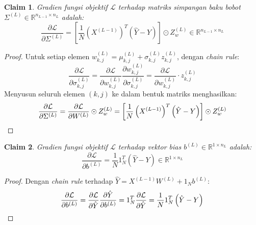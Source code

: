 \documentclass[11pt,a4paper]{article}
\def\mathbf#1{#1}%
\theoremstyle{plain}
\newtheorem{claim}{Claim}[section]
\theoremstyle{definition}
\theoremstyle{remark}
\begin{document}
\begin{claim}
Gradien fungsi objektif $\mathcal{L}$ terhadap matriks simpangan baku bobot $\Sigma^{(L)} \in \mathbb{R}^{n_{L-1} \times n_L}$ adalah:
\begin{equation}
    \frac{\partial \mathcal{L}}{\partial \Sigma^{(L)}} = \left[ \frac{1}{N} \left( X^{(L-1)} \right)^T \left( \hat{Y} - Y \right) \right] \odot Z_w^{(L)} \in \mathbb{R}^{n_{L-1} \times n_L} \label{eq:grad_SigmaL}
\end{equation}
\end{claim}
\begin{proof}
Untuk setiap elemen $w^{(L)}_{k, j} = \mu^{(L)}_{k, j} + \sigma^{(L)}_{k, j} z^{(L)}_{k, j}$, dengan \textit{chain rule}:
\begin{equation}
    \frac{\partial \mathcal{L}}{\partial \sigma^{(L)}_{k, j}} = \frac{\partial \mathcal{L}}{\partial w^{(L)}_{k, j}} \frac{\partial w^{(L)}_{k, j}}{\partial \sigma^{(L)}_{k, j}} = \frac{\partial \mathcal{L}}{\partial w^{(L)}_{k, j}} \cdot z^{(L)}_{k, j}
\end{equation}
Menyusun seluruh elemen $(k, j)$ ke dalam bentuk matriks menghasilkan:
\begin{equation}
    \frac{\partial \mathcal{L}}{\partial \Sigma^{(L)}} = \frac{\partial \mathcal{L}}{\partial W^{(L)}} \odot Z_w^{(L)} = \left[ \frac{1}{N} \left( X^{(L-1)} \right)^T \left( \hat{Y} - Y \right) \right] \odot Z_w^{(L)} \qedhere
\end{equation}
\end{proof}

\begin{claim}
Gradien fungsi objektif $\mathcal{L}$ terhadap vektor bias $\mathbf{b}^{(L)} \in \mathbb{R}^{1 \times n_L}$ adalah:
\begin{equation}
    \frac{\partial \mathcal{L}}{\partial \mathbf{b}^{(L)}} = \frac{1}{N} \mathbf{1}_N^T \left( \hat{Y} - Y \right) \in \mathbb{R}^{1 \times n_L} \label{eq:grad_bL}
\end{equation}
\end{claim}
\begin{proof}
Dengan \textit{chain rule} terhadap $\hat{Y} = X^{(L-1)} W^{(L)} + \mathbf{1}_N \mathbf{b}^{(L)}$:
\begin{equation}
    \frac{\partial \mathcal{L}}{\partial \mathbf{b}^{(L)}} = \frac{\partial \mathcal{L}}{\partial \hat{Y}} \frac{\partial \hat{Y}}{\partial \mathbf{b}^{(L)}} = \mathbf{1}_N^T \frac{\partial \mathcal{L}}{\partial \hat{Y}} = \frac{1}{N} \mathbf{1}_N^T \left( \hat{Y} - Y \right) \qedhere
\end{equation}
\end{proof}
\end{document}
